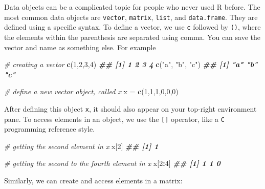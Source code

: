 \documentclass[
]{book}
\newenvironment{Shaded}{\begin{snugshade}}{\end{snugshade}}
\newcommand{\CommentTok}[1]{\textcolor[rgb]{0.56,0.35,0.01}{\textit{#1}}}
\newcommand{\DecValTok}[1]{\textcolor[rgb]{0.00,0.00,0.81}{#1}}
\newcommand{\DocumentationTok}[1]{\textcolor[rgb]{0.56,0.35,0.01}{\textbf{\textit{#1}}}}
\newcommand{\FunctionTok}[1]{\textcolor[rgb]{0.13,0.29,0.53}{\textbf{#1}}}
\newcommand{\NormalTok}[1]{#1}
\newcommand{\OtherTok}[1]{\textcolor[rgb]{0.56,0.35,0.01}{#1}}
\newcommand{\SpecialCharTok}[1]{\textcolor[rgb]{0.81,0.36,0.00}{\textbf{#1}}}
\newcommand{\StringTok}[1]{\textcolor[rgb]{0.31,0.60,0.02}{#1}}
\theoremstyle{definition}
\theoremstyle{definition}
\theoremstyle{definition}
\theoremstyle{definition}
\theoremstyle{remark}
\begin{document}
Data objects can be a complicated topic for people who never used R before. The most common data objects are \texttt{vector}, \texttt{matrix}, \texttt{list}, and \texttt{data.frame}. They are defined using a specific syntax. To define a vector, we use \texttt{c} followed by \texttt{()}, where the elements within the parenthesis are separated using comma. You can save the vector and name as something else. For example

\begin{Shaded}
\begin{Highlighting}[]
    \CommentTok{\# creating a vector}
    \FunctionTok{c}\NormalTok{(}\DecValTok{1}\NormalTok{,}\DecValTok{2}\NormalTok{,}\DecValTok{3}\NormalTok{,}\DecValTok{4}\NormalTok{)}
\DocumentationTok{\#\# [1] 1 2 3 4}
    \FunctionTok{c}\NormalTok{(}\StringTok{"a"}\NormalTok{, }\StringTok{"b"}\NormalTok{, }\StringTok{"c"}\NormalTok{)}
\DocumentationTok{\#\# [1] "a" "b" "c"}
    
    \CommentTok{\# define a new vector object, called \textasciigrave{}x\textasciigrave{}}
\NormalTok{    x }\OtherTok{=} \FunctionTok{c}\NormalTok{(}\DecValTok{1}\NormalTok{,}\DecValTok{1}\NormalTok{,}\DecValTok{1}\NormalTok{,}\DecValTok{0}\NormalTok{,}\DecValTok{0}\NormalTok{,}\DecValTok{0}\NormalTok{)}
\end{Highlighting}
\end{Shaded}

After defining this object \texttt{x}, it should also appear on your top-right environment pane. To access elements in an object, we use the \texttt{{[}{]}} operator, like a \texttt{C} programming reference style.

\begin{Shaded}
\begin{Highlighting}[]
    \CommentTok{\# getting the second element in x}
\NormalTok{    x[}\DecValTok{2}\NormalTok{]}
\DocumentationTok{\#\# [1] 1}
  
    \CommentTok{\# getting the second to the fourth element in x}
\NormalTok{    x[}\DecValTok{2}\SpecialCharTok{:}\DecValTok{4}\NormalTok{]}
\DocumentationTok{\#\# [1] 1 1 0}
\end{Highlighting}
\end{Shaded}

Similarly, we can create and access elements in a matrix:
\end{document}
